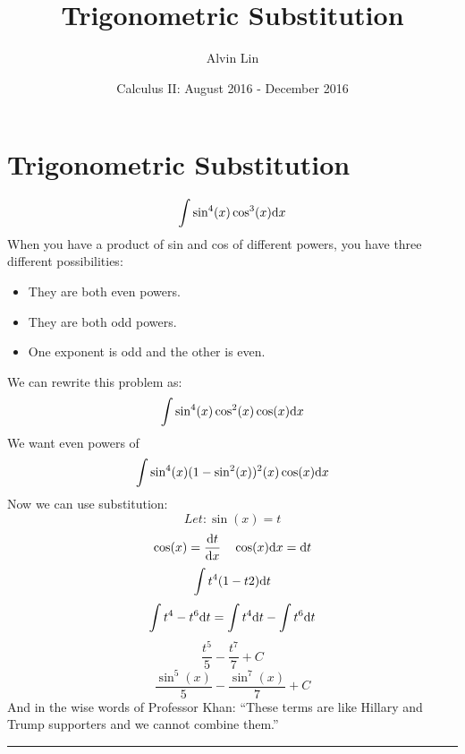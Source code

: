 \documentclass[letterpaper, 12pt]{math}
\title{Trigonometric Substitution}
\author{Alvin Lin}
\date{Calculus II: August 2016 - December 2016}
\begin{document}
\maketitle

\section*{Trigonometric Substitution}
\[ \int{\sin^{4}(x)\cos^{3}(x)\mathrm{d}{x}} \]
When you have a product of sin and cos of different powers,
you have three different possibilities:
\begin{itemize}
  \item They are both even powers.
  \item They are both odd powers.
  \item One exponent is odd and the other is even.
\end{itemize}
We can rewrite this problem as:
\[ \int{\sin^{4}(x)\cos^{2}(x)\cos(x)\mathrm{d}{x}} \]
We want even powers of
\[ \int{\sin^{4}(x)(1-\sin^{2}(x))^{2}(x)\cos(x)\mathrm{d}{x}} \]
Now we can use substitution:
\[ Let: \sin(x) = t \]
\[ \cos(x) = \frac{\mathrm{d}{t}}{\mathrm{d}{x}} \quad \cos(x)\mathrm{d}{x} = \mathrm{d}{t} \]
\[ \int{t^{4}(1-t{2})\mathrm{d}{t}} \]
\[ \int{t^{4}-t^{6}\mathrm{d}{t}} = \int{t^{4}\mathrm{d}{t}}-\int{t^{6}\mathrm{d}{t}} \]
\[ \frac{t^{5}}{5}-\frac{t^{7}}{7}+C \]
\[ \frac{\sin^{5}(x)}{5}-\frac{\sin^{7}(x)}{7}+C \]
And in the wise words of Professor Khan: ``These terms are like Hillary and
Trump supporters and we cannot combine them.''

\noindent\rule{13.7cm}{0.4pt}
\end{document}
